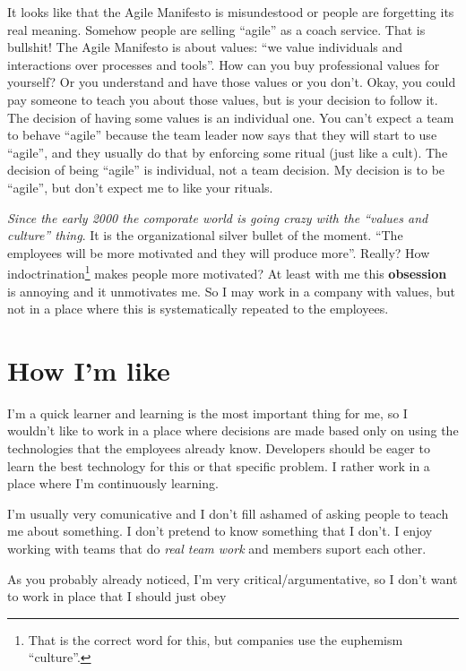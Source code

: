 \documentclass[11pt,a4paper,sans]{moderncv}
\begin{document}
It looks like that the Agile Manifesto is misundestood or people are
forgetting its real meaning. Somehow people are selling ``agile'' as a
coach service. That is bullshit! The Agile Manifesto is about values:
``we value individuals and interactions over processes and tools''.
How can you buy professional values for yourself? Or you understand
and have those values or you don't. Okay, you could pay someone to
teach you about those values, but is your decision to follow it. The
decision of having some values is an individual one. You can't expect
a team to behave ``agile'' because the team leader now says that they
will start to use ``agile'', and they usually do that by enforcing
some ritual (just like a cult).  The decision of being ``agile'' is
individual, not a team decision.  My decision is to be ``agile'', but
don't expect me to like your rituals.

\textit{Since the early 2000 the comporate world is going crazy with the
``values and culture'' thing}. It is the
organizational silver bullet of the moment. ``The employees will be
more motivated and they will produce more''.  Really? How
indoctrination\footnote{That is the correct word for this, but
  companies use the euphemism ``culture''.} makes people more
motivated? At least with me this \textbf{obsession} is annoying and it
unmotivates me.  So I may work in a company with values, but not in a
place where this is systematically repeated to the employees.

\section{How I'm like}
I'm a quick learner and learning is the most important thing for me,
so I wouldn't like to work in a place where decisions are made based
only on using the technologies that the employees already
know. Developers should be eager to learn the best technology for this or that
specific problem. I rather work in a place where I'm continuously learning.

I'm usually very comunicative and I don't fill ashamed of asking people
to teach me about something. I don't pretend to know something that I don't.
I enjoy working with teams that do \textit{real team work} and members
suport each other. 

As you probably already noticed, I'm very critical/argumentative, so
I don't want to work in place that I should just obey 
\end{document}
